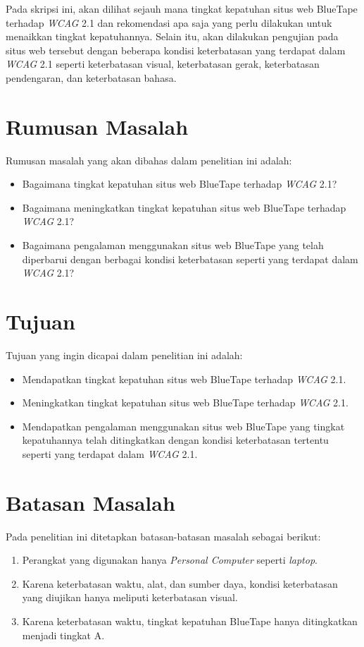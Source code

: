 Pada skripsi ini, akan dilihat sejauh mana tingkat kepatuhan situs web BlueTape terhadap \textit{WCAG} 2.1 dan rekomendasi apa saja yang perlu dilakukan untuk menaikkan tingkat kepatuhannya. Selain itu, akan dilakukan pengujian pada situs web tersebut dengan beberapa kondisi keterbatasan yang terdapat dalam \textit{WCAG} 2.1 seperti keterbatasan visual, keterbatasan gerak, keterbatasan pendengaran, dan keterbatasan bahasa.

\section{Rumusan Masalah}
\label{sec:rumusan}
Rumusan masalah yang akan dibahas dalam penelitian ini adalah: 
\begin{itemize}
	\item Bagaimana tingkat kepatuhan situs web BlueTape terhadap \textit{WCAG} 2.1?
	\item Bagaimana meningkatkan tingkat kepatuhan situs web BlueTape terhadap \textit{WCAG} 2.1?  
	\item Bagaimana pengalaman menggunakan situs web BlueTape yang telah diperbarui dengan berbagai kondisi keterbatasan seperti yang terdapat dalam \textit{WCAG} 2.1?
\end{itemize}

\section{Tujuan}
\label{sec:tujuan}
Tujuan yang ingin dicapai dalam penelitian ini adalah:
\begin{itemize}
	\item Mendapatkan tingkat kepatuhan situs web BlueTape terhadap \textit{WCAG} 2.1.
	\item Meningkatkan tingkat kepatuhan situs web BlueTape terhadap \textit{WCAG} 2.1.
	\item Mendapatkan pengalaman menggunakan situs web BlueTape yang tingkat kepatuhannya telah ditingkatkan dengan kondisi keterbatasan tertentu seperti yang terdapat dalam \textit{WCAG} 2.1.
\end{itemize}

\section{Batasan Masalah}
\label{sec:batasan}
Pada penelitian ini ditetapkan batasan-batasan masalah sebagai berikut:
\begin{enumerate}
	\item Perangkat yang digunakan hanya \textit{Personal Computer} seperti \textit{laptop}.
	\item Karena keterbatasan waktu, alat, dan sumber daya, kondisi keterbatasan yang diujikan hanya meliputi keterbatasan visual.
	\item Karena keterbatasan waktu, tingkat kepatuhan BlueTape hanya ditingkatkan menjadi tingkat A.
\end{enumerate}

